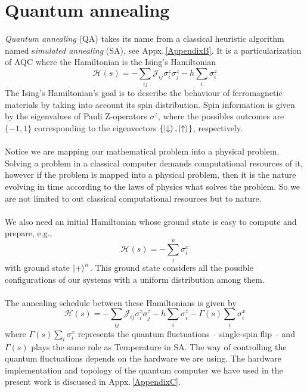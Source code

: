 \section{Quantum annealing}
\textit{Quantum annealing} (QA) takes its name from a classical heuristic algorithm named s\textit{imulated annealing} (SA), see Appx.\,\ref{AppendixB}. It is a particularization of AQC where the Hamiltonian is the Ising's Hamiltonian
\begin{equation}
    \mathcal{H}(s) = -\sum_{ij}\mathcal{J}_{ij}\sigma_{i}^{z}\sigma_{j}^{z} - h\sum_{i}\sigma_{i}^{z}
\end{equation}
The Ising's Hamiltonian's goal is to describe the behaviour of ferromagnetic materials by taking into account its spin distribution. Spin information is given by the eigenvalues of Pauli Z-operators $\sigma^{z}$, where the possibles outcomes are $\{-1,1\}$ corresponding to the eigenvectors $\{\ket{\downarrow},\ket{\uparrow}\}$, respectively.\\\\
Notice we are mapping our mathematical problem into a physical problem. Solving a problem in a classical computer demands computational resources of it, however if the problem is mapped into a physical problem, then it is the nature evolving in time according to the laws of physics what solves the problem. So we are not limited to out classical computational resources but to nature.\\\\
We also need an initial Hamiltonian whose ground state is easy to compute and prepare, e.g.,
\begin{equation}
    \mathcal{H}(s) = -\sum_{i}^{n}\sigma_{i}^{x}
\end{equation}
with ground state $\ket{+}^{n}$. This ground state considers all the possible configurations of our systems with a uniform distribution among them.\\\\
The annealing schedule between these Hamiltonians is given by
\begin{equation}
    \mathcal{H}(s) = -\sum_{ij}\mathcal{J}_{ij}\sigma_{i}^{z}\sigma_{j}^{z} - h\sum_{i}\sigma_{i}^{z} - \Gamma(s)\sum_{i}\sigma_{i}^{x}
\end{equation}
where $\Gamma(s)\sum_{i}\sigma_{i}^{x}$ represents the quantum fluctuations -- single-spin flip -- and $\Gamma(s)$ plays the same role as Temperature in SA. The way of controlling the quantum fluctuations depends on the hardware we are using. The hardware implementation and topology of the quantum computer we have used in the present work is discussed in Appx.\,\ref{AppendixC}.\\\\
